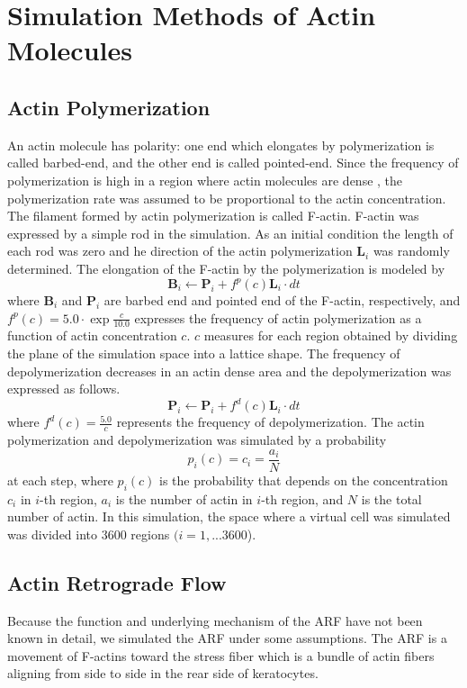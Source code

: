 \documentclass[a4paper,12pt, oneside]{book}
\begin{document}
\section{Simulation Methods of Actin Molecules}
\subsection{Actin Polymerization}
An actin molecule has polarity: one end which elongates by  polymerization is called barbed-end, and the other end is called pointed-end.
Since the frequency of polymerization is high in a region where actin molecules are dense \cite{svitkina1997analysis}, the polymerization rate was assumed to be  proportional to the actin concentration.
The filament formed by actin polymerization is called F-actin.
F-actin was expressed by a simple  rod in the simulation. 
As an initial condition the length of each rod was zero and he direction of the actin polymerization $\bm{L}_i$ was  randomly determined.
The elongation of the F-actin by the polymerization is modeled by
\begin{equation}
\bm{B}_i \gets \bm{P}_i + f^p(c)\bm{L}_i \cdot dt
\end{equation}
where $\bm{B}_i$ and $\bm{P}_i$ are barbed end and pointed end of the F-actin, respectively, and $f^p(c) = 5.0 \cdot \exp{\frac{c}{10.0}}$ expresses the frequency of actin polymerization as a function of actin concentration $c$.
$c$ measures for each region obtained by dividing the plane of the simulation space into a lattice shape.
The frequency of depolymerization decreases in an actin dense area and the depolymerization was expressed  as follows.
\begin{equation}
\bm{P}_i \gets \bm{P}_i + f^d(c)\bm{L}_i \cdot dt
\end{equation}
where $f^d(c) = \frac{5.0}{c}$ represents the frequency of depolymerization. 
The actin polymerization and depolymerization was simulated by a probability  \[p_i(c) = c_i = \frac{a_i}{N}\] at each step, where $p_i(c)$ is the probability that depends on the concentration $c_i$ in $i$-th region, $a_i$ is the number of actin in $i$-th region, and $N$ is the total number of actin.
In this simulation, the space where a virtual cell was simulated was divided into $3600$ regions $(i = 1,...3600$).

\subsection{Actin Retrograde Flow}
Because the function and underlying mechanism of the ARF have not been known in detail, we simulated the ARF under some assumptions. The ARF is a movement of F-actins toward the  stress fiber which is a bundle of actin fibers aligning from side to side in the rear side of keratocytes. 
\end{document}
